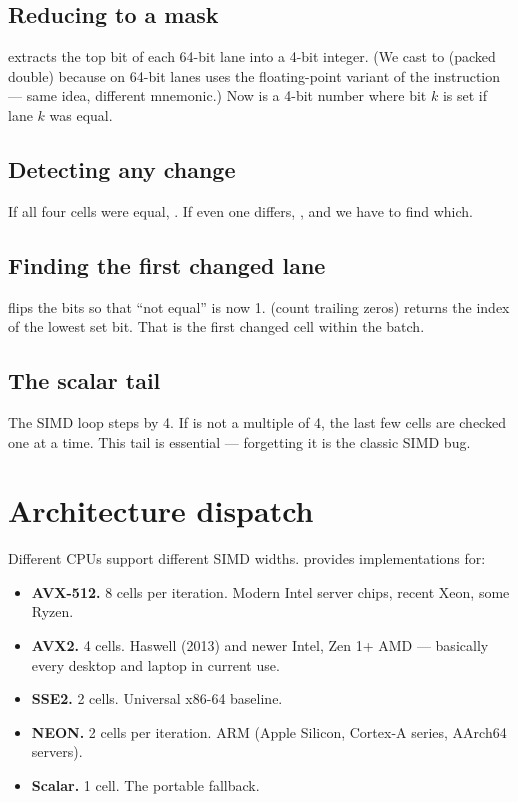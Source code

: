 \subsection{Reducing to a mask}

 extracts the top bit of each 64-bit
lane into a 4-bit integer. (We cast to  (packed double)
because  on 64-bit lanes uses the floating-point
variant of the instruction --- same idea, different mnemonic.) Now
 is a 4-bit number where bit $k$ is set if lane $k$ was
equal.

\subsection{Detecting any change}

If all four cells were equal, . If even one
differs, , and we have to find which.

\subsection{Finding the first changed lane}

 flips the bits so that ``not
equal'' is now 1.  (count trailing zeros)
returns the index of the lowest set bit. That is the first changed
cell within the batch.

\subsection{The scalar tail}

The SIMD loop steps by 4. If  is not a multiple of 4, the
last few cells are checked one at a time. This tail is essential ---
forgetting it is the classic SIMD bug.

\section{Architecture dispatch}

Different CPUs support different SIMD widths. \maya{} provides
implementations for:

\begin{itemize}[leftmargin=*]
  \item \textbf{AVX-512.} 8 cells per iteration. Modern Intel server
    chips, recent Xeon, some Ryzen.
  \item \textbf{AVX2.} 4 cells. Haswell (2013) and newer Intel,
    Zen 1+ AMD --- basically every desktop and laptop in current
    use.
  \item \textbf{SSE2.} 2 cells. Universal x86-64 baseline.
  \item \textbf{NEON.} 2 cells per iteration. ARM (Apple Silicon,
    Cortex-A series, AArch64 servers).
  \item \textbf{Scalar.} 1 cell. The portable fallback.
\end{itemize}

